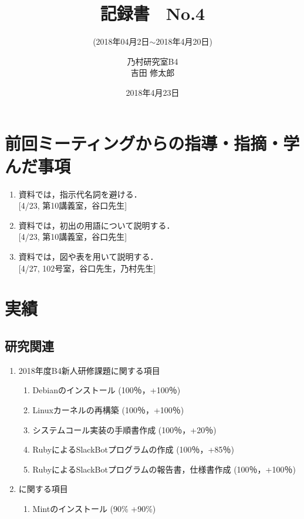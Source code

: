 \documentclass[fleqn, 14pt]{extarticle}
\subtitle{(2018年04月2日$\sim$2018年4月20日)}
\author{乃村研究室B4\\吉田 修太郎}
\date{2018年4月23日}
\title{記録書　No.4}
\begin{document}
\maketitle
\section{前回ミーティングからの指導・指摘・学んだ事項}
\label{sec1}
\begin{enumerate}
\item 資料では，指示代名詞を避ける．\\
  \hfill[4/23, 第10講義室，谷口先生]
\item 資料では，初出の用語について説明する．\\
  \hfill[4/23, 第10講義室，谷口先生]
\item 資料では，図や表を用いて説明する．\\
  \hfill[4/27, 102号室，谷口先生，乃村先生]
\end{enumerate}

\section{実績}
\label{sec2}
\subsection{研究関連}
\label{sec2-1}
\begin{enumerate}
\item 2018年度B4新人研修課題に関する項目
  \hfill
  \label{sec2-1-1}
  \begin{enumerate}
  \item Debianのインストール
    \hfill
    \label{sec2-1-1-enum1}
    (100％，+100％)
  \item Linuxカーネルの再構築
    \hfill
    \label{sec2-1-1-enum2}
    (100％，+100％)
  \item システムコール実装の手順書作成
    \hfill
    \label{sec2-1-1-enum3}
    (100％，+20％)
  \item RubyによるSlackBotプログラムの作成
    \hfill
    \label{sec2-1-1-enum4}
    (100％，+85％)
  \item RubyによるSlackBotプログラムの報告書，仕様書作成
    \hfill
    \label{sec2-1-1-enum5}
    (100％，+100％)
  \end{enumerate}
\item に関する項目
  \label{sec2-1-2}
  \begin{enumerate}
  \item Mintのインストール
    \label{sec2-1-2-enum1}
    \hfill
    (90\% +90\%)
  \end{enumerate}
\end{enumerate}
\end{document}
